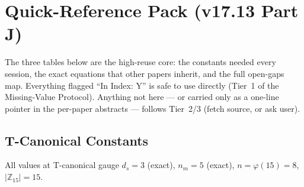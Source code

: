 \documentclass[11pt, a4paper]{article}
\newcommand{\Ztf}{\mathbb{Z}_{15}}
\begin{document}
\section{Quick-Reference Pack (v17.13 Part J)}

\begin{contentsbox}[title={What This Pack Is For}]
The three tables below are the high-reuse core: the constants needed
every session, the exact equations that other papers inherit, and the
full open-gaps map. Everything flagged ``In Index: Y'' is safe to use
directly (Tier~1 of the Missing-Value Protocol). Anything not here ---
or carried only as a one-line pointer in the per-paper abstracts ---
follows Tier~2/3 (fetch source, or ask user).
\end{contentsbox}

\subsection*{T-Canonical Constants}

All values at T-canonical gauge $d_s = 3$ (exact), $n_m = 5$ (exact),
$n = \varphi(15) = 8$, $|\Ztf| = 15$.
\end{document}
